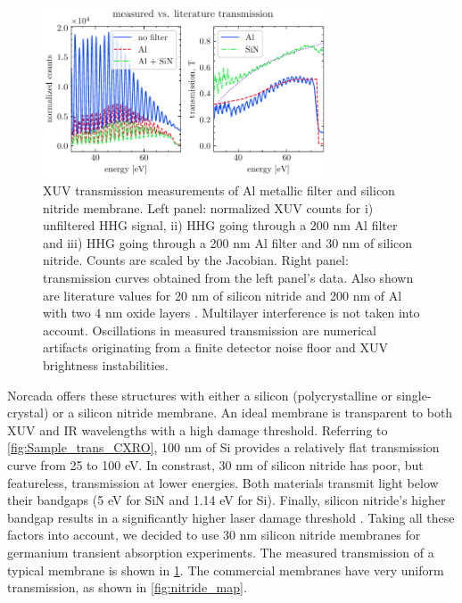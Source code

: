 \begin{figure}
	\centering
	\includegraphics[width=0.75\textwidth]{figures/chap4/SiN_Al_transmission.pdf}
	\caption{XUV transmission measurements of Al metallic filter and silicon nitride membrane. Left panel: normalized XUV counts for i) unfiltered HHG signal, ii) HHG going through a 200 nm Al filter and iii) HHG going through a 200 nm Al filter and 30 nm of silicon nitride. Counts are scaled by the Jacobian. Right panel: transmission curves obtained from the left panel's data. Also shown are literature values for 20 nm of silicon nitride and 200 nm of Al with two 4 nm oxide layers \cite{gulliksonCXROXRayInteractions}. Multilayer interference is not taken into account. Oscillations in measured transmission are numerical artifacts originating from a finite detector noise floor and XUV brightness instabilities.}
	\label{fig:SiN_Al_transmission}
\end{figure}

Norcada offers these structures with either a silicon (polycrystalline or single-crystal) or a silicon nitride membrane. An ideal membrane is transparent to both XUV and IR wavelengths with a high damage threshold. Referring to \cref{fig:Sample_trans_CXRO}, 100 nm of Si provides a relatively flat transmission curve from 25 to 100 eV. In constrast, 30 nm of silicon nitride has poor, but featureless, transmission at lower energies. Both materials transmit light below their bandgaps (5 eV for SiN and 1.14 eV for Si). Finally, silicon nitride's higher bandgap results in a significantly higher laser damage threshold \cite{gamalyAblationSolidsFemtosecond2002,austinFemtosecondLaserDamage2018,keldyshIonizationFieldStrong1965}. Taking all these factors into account, we decided to use 30 nm silicon nitride membranes for germanium transient absorption experiments. The measured transmission of a typical membrane is shown in \cref{fig:SiN_Al_transmission}. The commercial membranes have very uniform transmission, as shown in \cref{fig:nitride_map}.

